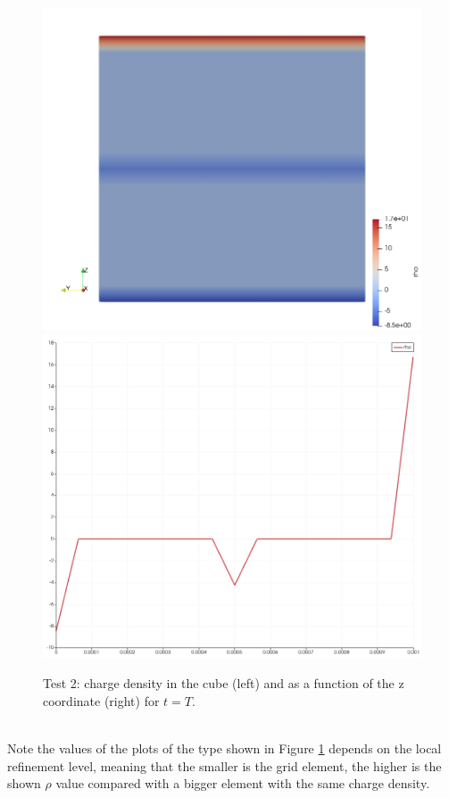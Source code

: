 \documentclass{Configuration_Files/PoliMi3i_thesis}
\begin{document}
\begin{figure}[h!]
    \centering
   \includegraphics[scale=0.2]{Images/2.rho_3d.jpeg}
   \includegraphics[scale=0.2]{Images/2.rho.jpeg}
    \caption {Test 2: charge density in the cube (left) and as a function of the z coordinate (right) for $t=T$.}
    \label{fig: 2.2}
\end{figure}
\\Note the values of the plots of the type shown in Figure \ref{fig: 2.2} depends on the local refinement level, meaning that the smaller is the grid element, the higher is the shown $\rho$ value compared with a bigger element with the same charge density.
\end{document}
